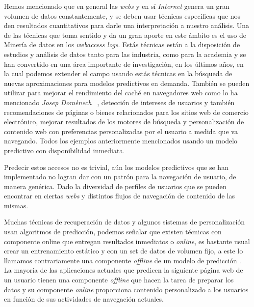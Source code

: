 Hemos mencionado  que  en general las \emph{webs}  y en sí \emph{Internet} genera un gran volumen de datos constantemente, y se deben usar técnicas específicas que nos den resultados cuantitativos para darle una interpretación a nuestro análisis. Una de las técnicas que toma sentido y da un gran aporte en este ámbito es el uso de Minería de datos  en los \emph{webaccess logs}.  Estás técnicas están a la disposición  de estudios y análisis de datos tanto para las industria, como para la academia y  se han convertido en una área importante  de investigación, en los últimos años, en la cual podemos extender el campo usando estás técnicas en la búsqueda de nuevas aproximaciones para modelos predictivos en demanda. También se pueden utilizar para mejorar el rendimiento del caché en navegadores web como lo ha mencionado \emph{Josep Domènech} \etal~\cite{Domenech2006},  detección de intereses de usuarios y también recomendaciones de páginas o bienes relacionados para los sitios {web} de comercio electrónico, mejorar  resultados de los motores de búsqueda y personalización de contenido web con preferencias personalizadas por el usuario a medida que va navegando. Todos los ejemplos anteriormente mencionados usando un modelo predictivo con disponibilidad inmediata.



Predecir estos  accesos no es trivial, aún los modelos predictivos que se han implementado no logran dar con un patrón para la navegación de usuario, de manera genérica. Dado la diversidad de perfiles de usuarios que se pueden encontrar en ciertas \emph{webs}  y distintos flujos de navegación de contenido de las mismas.  

Muchas técnicas de recuperación de datos y algunos sistemas de personalización usan algoritmos de predicción, podemos señalar que existen técnicas con componente online que entregan resultados inmediatos o \emph{online}, es bastante usual crear un entrenamiento estático y con un set de datos de volumen fijo, a este lo llamamos contrariamente una componente \emph{offline} de un modelo de predicción . La mayoría de las aplicaciones actuales que predicen la siguiente página web de un usuario tienen una componente  \emph{offline} que hacen la tarea de preparar los datos y su componente \emph{online}  proporciona contenido personalizado a los usuarios en función de sus actividades de navegación actuales.

